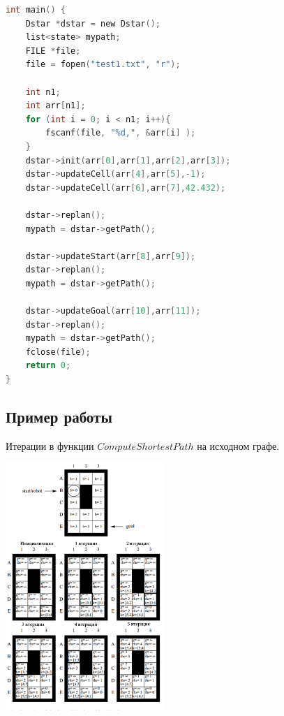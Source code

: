 \documentclass[12pt]{article}
\begin{document}
\begin{lstlisting}[language=C,style=C]
int main() {
    Dstar *dstar = new Dstar();
    list<state> mypath;
    FILE *file;
    file = fopen("test1.txt", "r");

    int n1;
    int arr[n1];
    for (int i = 0; i < n1; i++){
        fscanf(file, "%d,", &arr[i] );
    }
    dstar->init(arr[0],arr[1],arr[2],arr[3]); 
    dstar->updateCell(arr[4],arr[5],-1);     
    dstar->updateCell(arr[6],arr[7],42.432); 

    dstar->replan();               
    mypath = dstar->getPath();     

    dstar->updateStart(arr[8],arr[9]);      
    dstar->replan();               
    mypath = dstar->getPath();    

    dstar->updateGoal(arr[10],arr[11]);        
    dstar->replan();               
    mypath = dstar->getPath();     
    fclose(file);
    return 0;
}
\end{lstlisting}
\newpage
\begin{center}
   \section*{Пример работы}
\end{center}
Итерации в функции $ComputeShortestPath$ на исходном графе.
    \begin{center}
        \includegraphics[width=0.45\textwidth]{img/robot.png}
    \end{center}
\end{document}
